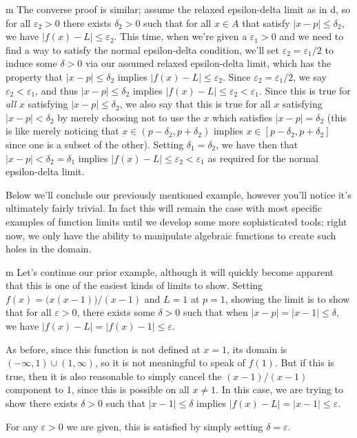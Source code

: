 \documentclass[11pt]{article}
\begin{document}
\begin{my proof}{m}
The converse proof is similar; assume the relaxed epsilon-delta limit as in d, so for all $\varepsilon_2 > 0$ there exists $\delta_2 > 0$ such that for all $x \in A$ that satisfy $|x - p| \le \delta_2$, we have $|f(x) - L| \le \varepsilon_2$. This time, when we're given a $\varepsilon_1 > 0$ and we need to find a way to satisfy the normal epsilon-delta condition, we'll set $\varepsilon_2 = \varepsilon_1/2$ to induce some $\delta > 0$ via our assumed relaxed epsilon-delta limit, which has the property that $|x - p| \le \delta_2$ implies $|f(x)- L| \le \varepsilon_2$. Since $\varepsilon_2 = \varepsilon_1/2$, we say $\varepsilon_2 < \varepsilon_1$, and thus $|x - p| \le \delta_2$ implies $|f(x) - L| \le \varepsilon_2 < \varepsilon_1$. Since this is true for \emph{all} $x$ satisfying $|x - p| \le \delta_2$, we also say that this is true for all $x$ satisfying $|x - p| < \delta_2$ by merely choosing not to use the $x$ which satisfies $|x-p| = \delta_2$ (this is like merely noticing that $x \in (p - \delta_2, p+\delta_2)$ implies $x \in [p - \delta_2,p + \delta_2]$ since one is a subset of the other). Setting $\delta_1 = \delta_2$, we have then that $|x-p| < \delta_2 = \delta_1$ implies $|f(x)-L| \le \varepsilon_2 < \varepsilon_1$ as required for the normal epsilon-delta limit.
\end{my proof}

Below we'll conclude our previously mentioned example, however you'll notice it's ultimately fairly trivial. In fact this will remain the case with most specific examples of function limits until we develop some more sophisticated tools; right now, we only have the ability to manipulate algebraic functions to create such holes in the domain.

\begin{example}{m}
Let's continue our prior example, although it will quickly become apparent that this is one of the easiest kinds of limits to show. Setting $f(x) = \big(x(x-1)\big)/(x-1)$ and $L = 1$ at $p=1$, showing the limit is to show that for all $\varepsilon > 0$, there exists some $\delta > 0$ such that when $|x - p| = |x - 1| \le \delta$, we have $|f(x) - L| = |f(x) - 1| \le \varepsilon$.

As before, since this function is not defined at $x = 1$, its domain is $(-\infty, 1) \cup (1, \infty)$, so it is not meaningful to speak of $f(1)$. But if this is true, then it is also reasonable to simply cancel the $(x-1)/(x-1)$ component to $1$, since this is possible on all $x \neq 1$. In this case, we are trying to show there exists $\delta > 0$ such that $|x - 1| \le \delta$ implies $|f(x) - L| = |x - 1| \le \varepsilon$.

For any $\varepsilon > 0$ we are given, this is satisfied by simply setting $\delta = \varepsilon$.
\end{example}
\end{document}
